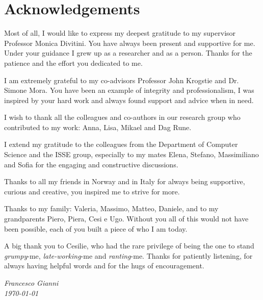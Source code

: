 \chapter{Acknowledgements}
\enlargethispage{\baselineskip}

Most of all, I would like to express my deepest gratitude to my supervisor Professor Monica Divitini. You have always been present and supportive for me. Under your guidance I grew up as a researcher and as a person. Thanks for the patience and the effort you dedicated to me.

I am extremely grateful to my co-advisors Professor John Krogstie and Dr. Simone Mora. You have been an example of integrity and professionalism, I was inspired by your hard work and always found support and advice when in need.

I wish to thank all the colleagues and co-authors in our research group who contributed to my work: Anna, Lisa, Mikael and Dag Rune.

I extend my gratitude to the colleagues from the Department of Computer Science and the ISSE group, especially to my mates Elena, Stefano, Massimiliano and Sofia for the engaging and constructive discussions.

Thanks to all my friends in Norway and in Italy for always being supportive, curious and creative, you inspired me to strive for more.

Thanks to my family: Valeria, Massimo, Matteo, Daniele, and to my grandparents Piero, Piera, Cesi e Ugo. Without you all of this would not have been possible, each of you built a piece of who I am today.

A big thank you to Cesilie, who had the rare privilege of being the one to stand \textit{grumpy}-me, \textit{late-working}-me and \textit{ranting}-me. Thanks for patiently listening, for always having helpful words and for the hugs of encouragement.

\begin{flushright}
\emph{\small Francesco Gianni}\\\emph{\small \today}
\end{flushright}

